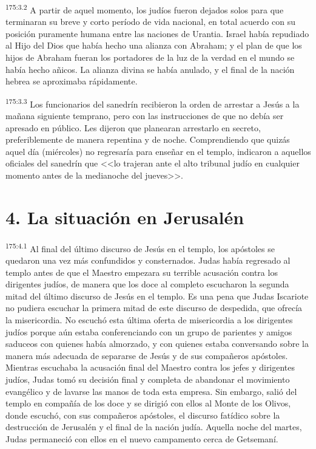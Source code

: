 \par 
\textsuperscript{175:3.2} A partir de aquel momento, los judíos fueron dejados solos para que terminaran su breve y corto período de vida nacional, en total acuerdo con su posición puramente humana entre las naciones de Urantia. Israel había repudiado al Hijo del Dios que había hecho una alianza con Abraham; y el plan de que los hijos de Abraham fueran los portadores de la luz de la verdad en el mundo se había hecho añicos. La alianza divina se había anulado, y el final de la nación hebrea se aproximaba rápidamente.

\par 
\textsuperscript{175:3.3} Los funcionarios del sanedrín recibieron la orden de arrestar a Jesús a la mañana siguiente temprano, pero con las instrucciones de que no debía ser apresado en público. Les dijeron que planearan arrestarlo en secreto, preferiblemente de manera repentina y de noche. Comprendiendo que quizás aquel día (miércoles) no regresaría para enseñar en el templo, indicaron a aquellos oficiales del sanedrín que <<lo trajeran ante el alto tribunal judío en cualquier momento antes de la medianoche del jueves>>.

\section*{4. La situación en Jerusalén}
\par 
\textsuperscript{175:4.1} Al final del último discurso de Jesús en el templo, los apóstoles se quedaron una vez más confundidos y consternados. Judas había regresado al templo antes de que el Maestro empezara su terrible acusación contra los dirigentes judíos, de manera que los doce al completo escucharon la segunda mitad del último discurso de Jesús en el templo. Es una pena que Judas Iscariote no pudiera escuchar la primera mitad de este discurso de despedida, que ofrecía la misericordia. No escuchó esta última oferta de misericordia a los dirigentes judíos porque aún estaba conferenciando con un grupo de parientes y amigos saduceos con quienes había almorzado, y con quienes estaba conversando sobre la manera más adecuada de separarse de Jesús y de sus compañeros apóstoles. Mientras escuchaba la acusación final del Maestro contra los jefes y dirigentes judíos, Judas tomó su decisión final y completa de abandonar el movimiento evangélico y de lavarse las manos de toda esta empresa. Sin embargo, salió del templo en compañía de los doce y se dirigió con ellos al Monte de los Olivos, donde escuchó, con sus compañeros apóstoles, el discurso fatídico sobre la destrucción de Jerusalén y el final de la nación judía. Aquella noche del martes, Judas permaneció con ellos en el nuevo campamento cerca de Getsemaní.

